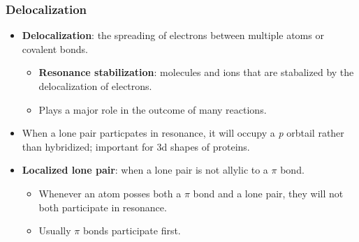 \documentclass[12pt,a4paper]{article}
\begin{document}
\begin{itemize}
    \subsubsection{Delocalization}
    \begin{itemize}
        \item \textbf{Delocalization}: the spreading of electrons between multiple atoms or covalent bonds.
        \begin{itemize}
            \item \textbf{Resonance stabilization}: molecules and ions that are {\color{o-Sun}stabalized} by the delocalization of electrons.
            \item Plays a major role in the outcome of many reactions.
        \end{itemize}
        \item When a lone pair particpates in resonance, it will occupy a \textit{p} orbtail rather than hybridized; important for 3d shapes of proteins.
        \item \textbf{Localized lone pair}: when a lone pair is not allylic to a $\pi$ bond. 
            \begin{itemize}
                \item Whenever an atom posses both a $\pi$ bond and a lone pair, they will not both participate in resonance.
                \item Usually $\pi$ bonds participate first.
            \end{itemize}
    \end{itemize}

\end{itemize}
\end{document}
